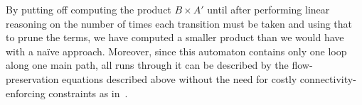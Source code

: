 By putting off computing the product $B \times A'$ until after performing linear
reasoning on the number of times each transition must be taken and using that to
prune the terms, we have computed a smaller product than we would have with a
na\"ive approach. Moreover, since this automaton contains only one loop along
one main path, all runs through it can be described by the flow-preservation
equations described above without the need for costly connectivity-enforcing
constraints as in~\cite{generate-parikh-image}.


